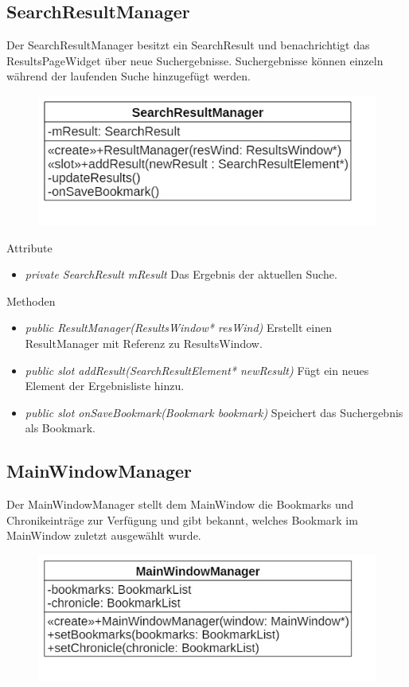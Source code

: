 \subsection*{SearchResultManager}
Der SearchResultManager besitzt ein SearchResult und benachrichtigt das ResultsPageWidget über neue Suchergebnisse. Suchergebnisse können einzeln während der laufenden Suche hinzugefügt werden.

\begin{figure}[H]
\centering
\includegraphics[scale=0.5]{img/Klassendiagramm/Klassen/Controller/SearchResultManager}
\label{fig:searchResultManager}
\end{figure}

Attribute
\begin{itemize}
	\item\textit{private SearchResult mResult}
	Das Ergebnis der aktuellen Suche.
\end{itemize}

Methoden
\begin{itemize}
	\item\textit{public ResultManager(ResultsWindow* resWind)}
	Erstellt einen ResultManager mit Referenz zu ResultsWindow.
	\item\textit{public slot addResult(SearchResultElement* newResult)}
	Fügt ein neues Element der Ergebnisliste hinzu.
	\item\textit{public slot onSaveBookmark(Bookmark bookmark)}
 	Speichert das Suchergebnis als Bookmark.
\end{itemize}

\subsection*{MainWindowManager}
Der MainWindowManager stellt dem MainWindow die Bookmarks und Chronikeinträge zur Verfügung und gibt bekannt, welches Bookmark im MainWindow zuletzt ausgewählt wurde.

\begin{figure}[H]
\centering
\includegraphics[scale=0.5]{img/Klassendiagramm/Klassen/Controller/MainWindowManager}
\label{fig:mainWindowManager}
\end{figure}

